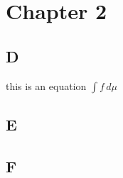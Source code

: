 \chapter{Chapter 2}
\minitoc%

\section{D}
this is an equation $\displaystyle \int f \, d\mu$
\section{E}
\section{F}